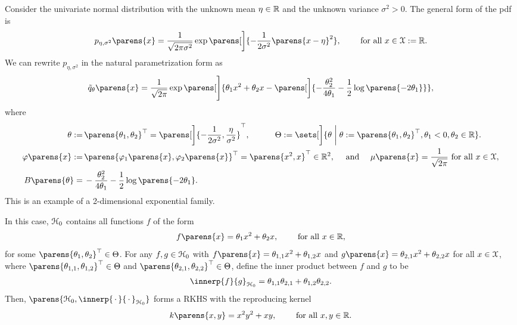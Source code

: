 
\begin{example}
	Consider the univariate normal distribution with the unknown mean $\eta \in \mathbb{R}$ and the unknown variance $\sigma^2 > 0$. The general form of the pdf is 
	\begin{align*}
		p_{\eta, \sigma^2} \parens{x} = \frac{1}{\sqrt{2 \pi \sigma^2}} \exp \parens[\bigg]{- \frac{1}{2\sigma^2} \parens{x - \eta}^2}, \qquad \text{ for all } x \in \calX := \Real. 
	\end{align*}
	We can rewrite $p_{\eta, \sigma^2}$ in the natural parametrization form as 
	\begin{align*}
		\tilde{q}_{\theta} \parens{x} = \frac{1}{\sqrt{2\pi}} \exp \parens[\Bigg]{\theta_1 x^2 + \theta_2 x - \parens[\bigg]{ - \frac{\theta_2^2}{4\theta_1} - \frac{1}{2} \log \parens{-2\theta_1}}}, 
	\end{align*}
	where 
	\begin{align*}
		\theta := & \, \parens{\theta_1, \theta_2}^\top = \parens[\bigg]{-\frac{1}{2\sigma^2}, \frac{\eta}{\sigma^2}}^\top, \qquad \quad \Theta := \sets[\bigg]{\theta \biggm| \theta := \parens{\theta_1, \theta_2}^\top, \theta_1 < 0, \theta_2 \in \Real}. \\ 
		\varphi \parens{x} := & \, \parens{\varphi_1 \parens{x}, \varphi_2 \parens{x}}^\top = \parens{x^2, x}^\top \in \Real^2, \quad \text{ and } \quad
		\mu \parens{x} = \frac{1}{\sqrt{2\pi}} \text{ for all } x \in \calX, \\ 
		B \parens{\theta} = & \, - \frac{\theta_2^2}{4\theta_1} - \frac{1}{2} \log \parens{-2\theta_1}. 
		\end{align*}
	This is an example of a 2-dimensional exponential family. 

	In this case, $\mathcal{H}_0$ contains all functions $f$ of the form 
	\begin{align*}
		f \parens{x} = \theta_1 x^2 + \theta_2 x, \qquad \text{ for all } x \in \Real, 
	\end{align*}
	for some $\parens{\theta_1, \theta_2}^\top \in \Theta$. For any $f, g \in \mathcal{H}_0$ with $f \parens{x} = \theta_{1,1} x^2 + \theta_{1, 2} x$ and $g \parens{x} = \theta_{2, 1} x^2 + \theta_{2, 2} x$ for all $x \in \mathcal{X}$, where $\parens{\theta_{1,1}, \theta_{1,2}}^\top \in \Theta$ and $\parens{\theta_{2,1}, \theta_{2,2}}^\top \in \Theta$, define the inner product between $f$ and $g$ to be 
	\begin{align*}
		\innerp{f}{g}_{\calH_0} = \theta_{1,1} \theta_{2,1} + \theta_{1,2} \theta_{2,2}. 
	\end{align*}
	Then, $\parens{\calH_0, \innerp{\,\cdot\,}{\,\cdot\,}_{\calH_0}}$ forms a RKHS with the reproducing kernel 
	\begin{align*}
		k \parens{x, y} = x^2 y^2 + x y, \qquad \text{ for all } x, y \in \Real. 
	\end{align*}
	

\end{example}
